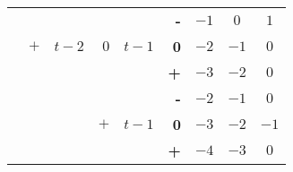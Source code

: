 \documentclass{article}[]
\begin{document}
\begin{center}
\begin{tabular}{r | r | r | r | r | r | c c c | }
&&&&&\textbf{-}                     & $-1$	& $0$	& $1$ \\ 
&$+$&$t-2$&$0$&$t-1$&\textbf{0}     & $-2$	& $-1$	& $0$	\\
&&&&&\textbf{+}                     & $-3$	& $-2$	& $0$ \\ \cline{4-4} \cline{6-9}

&&&&&\textbf{-}                     & $-2$	& $-1$	& $0$ \\ 
&&&$+$   &$t-1$ & \textbf{0}        & $-3$	& $-2$	& $-1$	\\
&&&&&\textbf{+}                     & $-4$	& $-3$	& $0$ \\ \cline{2-2} \cline{4-4} \cline{6-9}
\end{tabular}    
\end{center}
\end{document}
